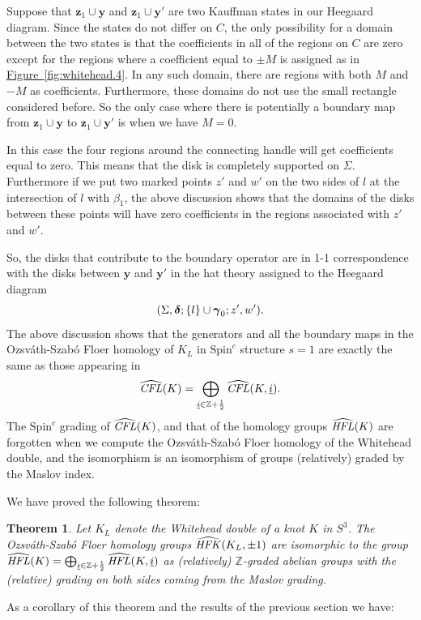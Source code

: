 \documentclass{gtart_h}
\def\figref#1{\hyperlink{#1anchor}{Figure~\ref*{#1}}}
\newtheorem{thm}{Theorem}[section]
\theoremstyle{definition}
\newcommand{\ui}{\underline{i}}
\newcommand\z{\mathbf z}
\newcommand\y{\mathbf y}
\newcommand\gammas{\mbox{\boldmath$\gamma$}}
\newcommand\deltas{\mbox{\boldmath$\delta$}}
\newcommand\HFK{\text{\it HFK\/}}
\newcommand\HFL{\text{\it HFL\/}}
\newcommand\CFL{\text{\it CFL\/}}
\newcommand{\SpinC}{{\mathrm{Spin}}^c}
\begin{document}
Suppose that $\z_1\cup \y$ and $\z_1\cup \y'$
are two Kauffman states in our Heegaard diagram. Since the states
do not differ on $C$, the
only possibility for a domain between the two states is that the coefficients in
all of the regions on $C$ are zero except for the regions where a coefficient equal to
$\pm M$ is assigned as in \figref{fig:whitehead.4}.
In any such domain, there are regions with both
$M$ and $-M$ as coefficients. Furthermore, these domains do not use the small rectangle
considered before. So the only case where there is potentially a boundary map from
$\z_1\cup \y$ to $\z_1\cup \y'$ is when we have $M=0$.

In this case the four regions around the connecting handle will get coefficients equal to
zero. This means that the disk is completely supported on $\Sigma$. Furthermore
if we put two marked points $z'$ and $w'$ on the two sides of $l$ at the intersection of $l$ with
$\beta_1$, the above discussion shows that the domains of the disks between these points will have
zero coefficients in the regions associated with $z'$ and $w'$.

So, the  disks that contribute to the boundary operator are in 1-1 correspondence
with the disks between $\y$ and $\y'$ in the hat theory assigned to
the Heegaard diagram
$$
(\Sigma,\deltas;\{l\}\cup \gammas_0;z',w').$$
The above discussion shows that the generators and all the boundary maps in the
Ozsv\'ath-Szab\'o Floer homology of $K_L$ in $\SpinC$ structure $s=1$ are exactly
the same as those appearing in
$$
\widehat{\CFL}(K)=\bigoplus_{\ui\in \mathbb{Z}+\frac{1}{2}}\widehat{\CFL}(K,\ui).
$$
The $\SpinC$ grading of $\widehat{\CFL}(K)$, and that of the homology groups
$\widehat{\HFL}(K)$ are forgotten when we compute the Ozsv\'ath-Szab\'o
Floer homology of the Whitehead double, and the isomorphism is an isomorphism
of groups (relatively) graded by the Maslov index.

We have proved the following theorem:

\begin{thm}{Let $K_L$ denote the Whitehead double of a knot $K$ in $S^3$. The
Ozsv\'ath-Szab\'o Floer homology groups $\widehat{\HFK}(K_L,\pm 1)$ are isomorphic to the
group $\widehat{\HFL}(K)=\bigoplus_{\ui\in
  \mathbb{Z}+\frac{1}{2}}\widehat{\HFL}(K,
\ui)$ as (relatively)
$\mathbb{Z}$-graded abelian groups with the (relative) grading on both sides coming from the
Maslov grading.}
\end{thm}
As a corollary of this theorem and the results of the previous section we have:
\end{document}
